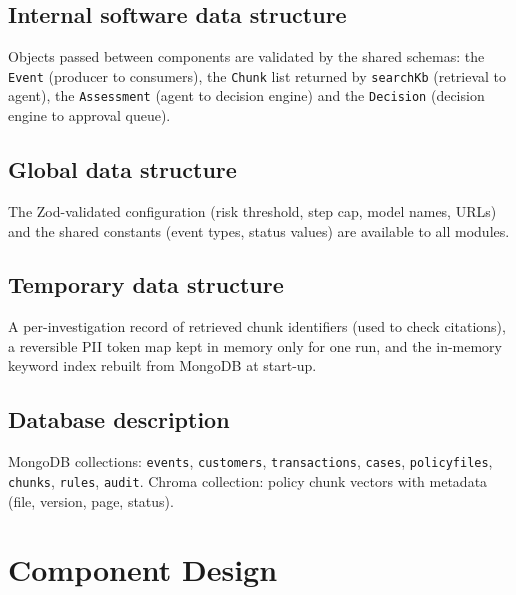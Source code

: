 \documentclass[oneside,a4paper,12pt]{report}
\begin{document}
\subsection{Internal software data structure}
Objects passed between components are validated by the shared schemas: the \texttt{Event} (producer to consumers), the \texttt{Chunk} list returned by \texttt{searchKb} (retrieval to agent), the \texttt{Assessment} (agent to decision engine) and the \texttt{Decision} (decision engine to approval queue).

\subsection{Global data structure}
The Zod-validated configuration (risk threshold, step cap, model names, URLs) and the shared constants (event types, status values) are available to all modules.

\subsection{Temporary data structure}
A per-investigation record of retrieved chunk identifiers (used to check citations), a reversible PII token map kept in memory only for one run, and the in-memory keyword index rebuilt from MongoDB at start-up.

\subsection{Database description}
MongoDB collections: \texttt{events}, \texttt{customers}, \texttt{transactions}, \texttt{cases}, \texttt{policyfiles}, \texttt{chunks}, \texttt{rules}, \texttt{audit}. Chroma collection: policy chunk vectors with metadata (file, version, page, status).

\section{Component Design}
\end{document}
